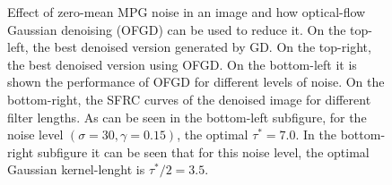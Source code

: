 \documentclass{article}
\begin{document}
\begin{figure}
  \centering
  \caption{Effect of zero-mean MPG noise in an image and how optical-flow Gaussian
    denoising (OFGD) can be used to reduce it. On the top-left, the best
    denoised version generated by GD. On the top-right, the best denoised version using
    OFGD. On the bottom-left it is shown the performance
    of OFGD for different levels of noise. On the bottom-right, the SFRC curves
    of the denoised image for different filter lengths. As can be seen
    in the bottom-left subfigure, for the noise level $(\sigma=30,
    \gamma=0.15)$, the optimal $\tau^*=7.0$. In the bottom-right
    subfigure it can be seen that for this noise level, the optimal
    Gaussian kernel-lenght is $\tau^*/2=3.5$.
    \label{fig:OFGD_0MMPG}}
\end{figure}
\end{document}
